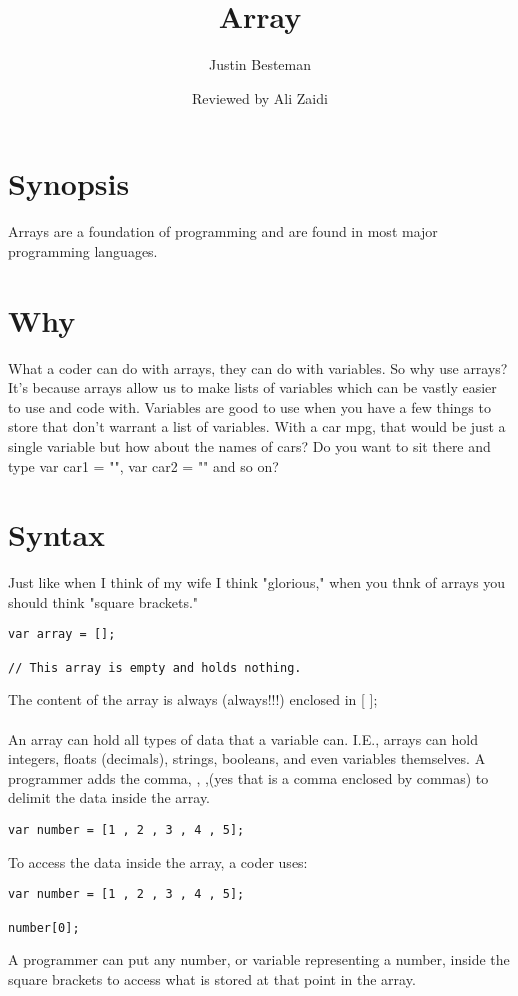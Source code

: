 \documentclass[12pt, letterpaper]{article}
\title{Array}
\author{Justin Besteman}
\date{Reviewed by Ali Zaidi}
\begin{document}
\maketitle


\section*{Synopsis}

Arrays are a foundation of programming and are found in most major programming languages.

\section*{Why}

What a coder can do with arrays, they can do with variables. So why use arrays? It's because arrays allow us to make lists of variables which can be vastly easier to use and code with. Variables are good to use when you have a few things to store that don't warrant a list of variables. With a car mpg, that would be just a single variable but how about the names of cars? Do you want to sit there and type var car1 = "", var car2 = "" and so on? \\


\section*{Syntax}

Just like when I think of my wife I think "glorious," when you thnk of arrays you should think "square brackets."
\begin{lstlisting}
var array = [];

// This array is empty and holds nothing. 
\end{lstlisting}
The content of the array is always (always!!!) enclosed in [ ];\\ \\
An array can hold all types of data that a variable can. I.E., arrays can hold integers, floats (decimals), strings, booleans, and even variables themselves. A programmer adds the comma, , ,(yes that is a comma enclosed by commas) to delimit the data inside the array.\\
\begin{lstlisting}
var number = [1 , 2 , 3 , 4 , 5];
\end{lstlisting}
To access the data inside the array, a coder uses: 
\begin{lstlisting}
var number = [1 , 2 , 3 , 4 , 5];

number[0];
\end{lstlisting}
A programmer can put any number, or variable representing a number, inside the square brackets to access what is stored at that point in the array. 
\end{document}
